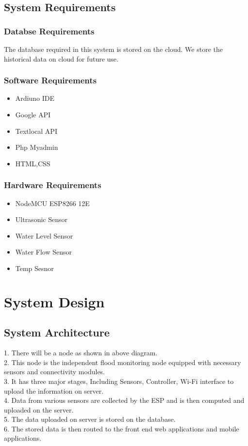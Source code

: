 \documentclass[a4paper,12pt]{report}
\begin{document}
\begin{itemize}
\section{System Requirements}

\subsection{Databse Requirements}
The database required in this system is stored on the cloud. We store
the historical data on cloud for future use.

\subsection{Software Requirements }
\begin{itemize}
\item  Ardiuno IDE
\item  Google API
\item  Textlocal API
\item  Php Myadmin
\item  HTML,CSS
\end{itemize}

\subsection{Hardware Requirements}
\begin{itemize}
\item  NodeMCU ESP8266 12E
\item  Ultrasonic Sensor
\item  Water Level Sensor
\item  Water Flow Sensor
\item  Temp Sesnor
\end{itemize}




\chapter {System Design}
\section{System Architecture}
1. There will be a node as shown in above diagram. \\
2. This node is the independent flood monitoring node equipped with necessary sensors and connectivity modules. \\
3. It has three major stages, Including Sensors, Controller, Wi-Fi interface to upload the information on server.\\
 4. Data from various sensors are collected by the ESP and is then computed and uploaded on the server.\\
 5. The data uploaded on server is stored on the database. \\
6. The stored data is then routed to the front end web applications and mobile applications.\\



\end{itemize}
\end{document}
